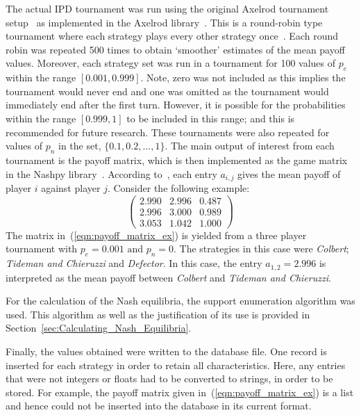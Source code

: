 The actual IPD tournament was run using the original Axelrod tournament
setup~\cite{adeoye2012application} as implemented in the
Axelrod library~\cite{axelrodproject}. This is a round-robin type tournament where each
strategy plays every other strategy once~\cite{axelrod1980effective}.
Each round robin was repeated 500 times to obtain `smoother' estimates of
the mean payoff values. Moreover, each strategy set was run in a tournament for
100 values of \(p_{e}\) within the range \([0.001, 0.999]\). Note, zero was
not included as this implies the tournament would never end and one was
omitted as the tournament would immediately end after the first turn. However,
it is possible for the probabilities within the range \([0.999, 1]\) to be
included in this range; and this is recommended for
future research. These tournaments were also repeated for values of \(p_{n}\) in the set, \( \{0.1, 0.2, \ldots, 1\} \). The main output of interest
from each tournament is the payoff matrix, which is then implemented as the game
matrix in the Nashpy library~\cite{Nashpy2019}.
According to~\cite{axelrodproject}, each entry \(a_{i,j}\) gives the mean payoff
of player \(i\) against player \(j\). Consider the following example:
\begin{equation}
    \begin{pmatrix}\label{eqn:payoff_matrix_ex}
        2.990 &   2.996  &   0.487\\  
        2.996 &   3.000  &   0.989\\
        3.053 &   1.042  &   1.000        
    \end{pmatrix}
\end{equation}
The matrix in~(\ref{eqn:payoff_matrix_ex}) is yielded from a three player
tournament with \(p_{e}=0.001 \text{ and } p_{n}=0\). The strategies in this case were \textit{Colbert}; \textit{Tideman and Chieruzzi} and
\textit{Defector}. In this case, the entry \(a_{1,2} = 2.996\) is interpreted as the
mean payoff between \textit{Colbert} and \textit{Tideman and Chieruzzi}. 

For the calculation of the Nash equilibria, the support enumeration
algorithm was used. This algorithm as well as the justification of its use is
provided in Section~\ref{sec:Calculating_Nash_Equilibria}.

Finally, the values obtained were written to the database file. One record is
inserted for each strategy in order to retain all characteristics. Here, any
entries that were not integers or floats had to be converted to strings, in order
to be stored. For example, the payoff matrix given
in~(\ref{eqn:payoff_matrix_ex}) is a list and hence could not be inserted into the
database in its current format.


